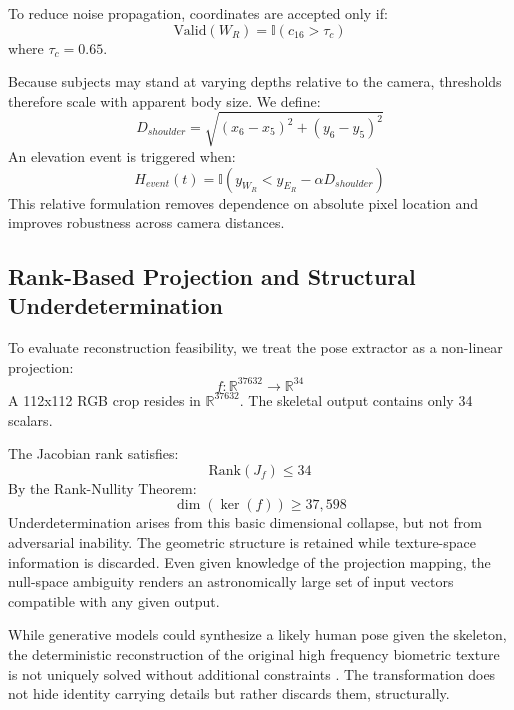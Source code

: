 \documentclass[conference]{IEEEtran}
\begin{document}
To reduce noise propagation, coordinates are accepted only if:
\begin{equation}
\text{Valid}(W_R) = \mathbb{I}(c_{16} > \tau_c)
\end{equation}
where $\tau_c = 0.65$.

Because subjects may stand at varying depths relative to the camera, thresholds therefore scale with apparent body size. We define:
\begin{equation}
D_{shoulder} = \sqrt{(x_6 - x_5)^2 + (y_6 - y_5)^2}
\end{equation}
An elevation event is triggered when:
\begin{equation}
H_{event}(t) = \mathbb{I}(y_{W_R} < y_{E_R} - \alpha D_{shoulder}) 
\end{equation}
This relative formulation removes dependence on absolute pixel location and improves robustness across camera distances.

\subsection{Rank-Based Projection and Structural Underdetermination}
To evaluate reconstruction feasibility, we treat the pose extractor as a non-linear projection:
\begin{equation}
f: \mathbb{R}^{37632} \rightarrow \mathbb{R}^{34}
\end{equation}
A 112x112 RGB crop resides in $\mathbb{R}^{37632}$. The skeletal output contains only 34 scalars.

The Jacobian rank satisfies:
\begin{equation}
\text{Rank}(J_f) \le 34
\end{equation}
By the Rank-Nullity Theorem:
\begin{equation}
\dim(\ker(f)) \ge 37,598
\end{equation}
Underdetermination arises from this basic dimensional collapse, but not from adversarial inability. The geometric structure is retained while texture-space information is discarded. Even given knowledge of the projection mapping, the null-space ambiguity renders an astronomically large set of input vectors compatible with any given output.

While generative models could synthesize a likely human pose given the skeleton, the deterministic reconstruction of the original high frequency biometric texture is not uniquely solved without additional constraints \cite{b18}. The transformation does not hide identity carrying details but rather discards them, structurally.
\end{document}
